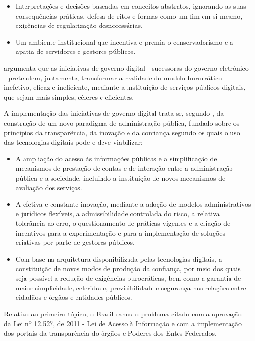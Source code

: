 \begin{itemize}
    \item Interpretações e decisões baseadas em conceitos abstratos, ignorando as suas consequências práticas, defesa de ritos e formas como um fim em si mesmo, exigências de regularização desnecessárias.
    \item Um ambiente institucional que incentiva e premia o conservadorismo e a apatia de servidores e gestores públicos.
\end{itemize}

\cite{de2020governo} argumenta que as iniciativas de governo digital - sucessoras do governo eletrônico - pretendem, justamente, transformar a realidade do modelo burocrático inefetivo, eficaz  e ineficiente, mediante a instituição de serviços públicos digitais, que sejam mais simples, céleres e eficientes.

A implementação das iniciativas de governo digital trata-se, segundo \cite{de2020governo}, da construção de um novo paradigma  de administração pública, fundado sobre os princípios da transparência, da inovação e da confiança  segundo os quais o uso das tecnologias digitais pode e deve viabilizar: 

\begin{itemize}
    \item A ampliação do acesso às informações públicas e a simplificação de 
    mecanismos de prestação de contas e de interação entre a administração 
    pública e a sociedade, incluindo a instituição de novos mecanismos de 
    avaliação dos serviços.
    \item A efetiva e constante inovação, mediante a adoção de modelos 
    administrativos e jurídicos flexíveis, a admissibilidade controlada do risco, a relativa tolerância ao erro, o questionamento de práticas vigentes e a criação de incentivos para a experimentação e para a implementação de soluções criativas por parte de gestores públicos.
    \item Com base na arquitetura disponibilizada pelas tecnologias digitais, a constituição de novos modos de produção da confiança, por meio dos quais seja possível a redução de exigências burocráticas, bem como a garantia de maior simplicidade, celeridade, previsibilidade e segurança nas relações entre cidadãos e órgãos e entidades públicos.
\end{itemize}

Relativo ao primeiro tópico, o Brasil sanou o problema citado com a aprovação da Lei nº 12.527, de 2011 - Lei de Acesso à Informação e com a implementação dos portais da transparência do órgãos e Poderes dos Entes Federados.

